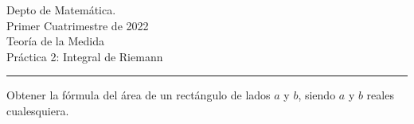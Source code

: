 \documentclass{book}
\begin{document}


\begin{large}
\begin{bfseries} %
        \noindent Depto de Matem\'atica.\\
        Primer Cuatrimestre de 2022\\                                                                                                                                                                                                                                                                                                                                                
        Teoría de la Medida \\
        Práctica 2: Integral de Riemann

\end{bfseries}
\end{large}
\par\noindent\rule{\textwidth}{.5pt}





\begin{ejer}{} Obtener la fórmula del área de un rect\'angulo de lados $a$ y $b$, siendo $a$ y $b$ reales cualesquiera.
\end{ejer}


\end{document}
